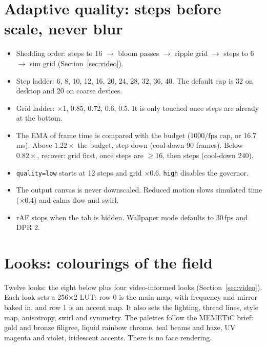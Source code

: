\documentclass[10pt,a4paper]{article}
\newcommand{\code}[1]{\texttt{\small #1}}
\begin{document}
\section{Adaptive quality: steps before scale, never blur}\label{sec:gov}
\begin{itemize}
\item Shedding order: steps to 16 $\to$ bloom passes $\to$ ripple grid $\to$ steps to 6 $\to$ sim grid (Section~\ref{sec:video}).
\item Step ladder: 6, 8, 10, 12, 16, 20, 24, 28, 32, 36, 40. The default cap is 32 on desktop and 20 on coarse devices.
\item Grid ladder: $\times$1, 0.85, 0.72, 0.6, 0.5. It is only touched once steps are already at the bottom.
\item The EMA of frame time is compared with the budget ($1000/\text{fps cap}$, or 16.7\,ms). Above $1.22\times$ the budget, step down
(cool-down 90 frames). Below $0.82\times$, recover: grid first, once steps are $\ge16$, then steps (cool-down 240).
\item \code{quality=low} starts at 12 steps and grid $\times$0.6. \code{high} disables the governor.
\item The output canvas is never downscaled. Reduced motion slows simulated time ($\times0.4$) and calms flow and swirl.
\item rAF stops when the tab is hidden. Wallpaper mode defaults to 30\,fps and DPR 2.
\end{itemize}

\section{Looks: colourings of the field}\label{sec:looks}
Twelve looks: the eight below plus four video-informed looks (Section~\ref{sec:video}).
Each look sets a 256$\times$2 LUT: row 0 is the main map, with frequency and mirror baked in, and row 1 is an accent map. It also sets the lighting,
thread lines, style map, anisotropy, swirl and symmetry. The palettes follow the MEMETiC brief: gold and bronze filigree,
liquid rainbow chrome, teal beams and haze, UV magenta and violet, iridescent accents. There is no face rendering.
\end{document}
